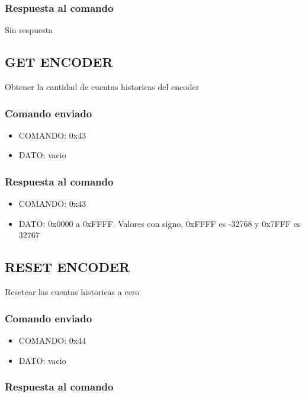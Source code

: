 \documentclass[a4paper,10pt]{article}
\begin{document}
\subsubsection*{Respuesta al comando}

Sin respuesta

\subsection{GET ENCODER}
\label{get_encoder}

Obtener la cantidad de cuentas historicas del encoder

\subsubsection*{Comando enviado}

\begin{itemize}
	\item{COMANDO:} 0x43
	\item{DATO:} vacio
\end{itemize}

\subsubsection*{Respuesta al comando}

\begin{itemize}
	\item{COMANDO:} 0x43
	\item{DATO:} 0x0000 a 0xFFFF. Valores con signo, 0xFFFF es -32768 y 0x7FFF es 32767
\end{itemize}

\subsection{RESET ENCODER}
\label{reset_encoder}

Resetear las cuentas historicas a cero

\subsubsection*{Comando enviado}

\begin{itemize}
	\item{COMANDO:} 0x44
	\item{DATO:} vacio
\end{itemize}

\subsubsection*{Respuesta al comando}
\end{document}
